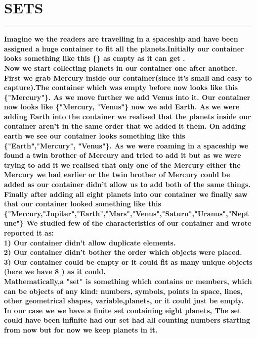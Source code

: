 \documentclass{article}
\begin{document}
\pagebreak

\section*{SETS}
\hrule 
\bigskip
\textbf{Imagine we the readers are travelling in a spaceship and  have been assigned a huge container  to fit all the planets.Initially our container looks something like this \{\} as empty as it can get . 
\\
Now we start collecting planets in our container one after another. First we grab Mercury inside our container(since it's small and easy to capture).The container which was empty before now looks like this \{"Mercury"\}. As we move further we add Venus into it. Our container now looks like \{"Mercury, "Venus"\} now we add Earth. 
As we were adding Earth into the container we realised that the planets inside our container aren't in the same order that we added it them. On adding earth we see our container looks something like this \{"Earth","Mercury", "Venus"\}. As we were roaming in a spaceship we found a twin brother of Mercury and tried to add it but as we were trying to add it we realised that only one of the Mercury either the Mercury we had earlier or the twin brother of Mercury could be added as our container didn't allow us to add both of the same things.  Finally after  adding all eight planets into our container we finally saw that our container looked something like this 
\{"Mercury,"Jupiter","Earth","Mars","Venus","Saturn","Uranus","Neptune"\}
We studied few of the characteristics of our container and wrote reported it as:
\\ 1) Our container didn't allow duplicate elements.
\\ 2) Our container didn't bother the order which objects were placed.
\\ 3) Our container could be empty or it could fit as many unique objects (here we have 8 ) as it could.\\Mathematically,a "set" is something which contains or members, which can be  objects of any kind: numbers, symbols, points in space, lines, other geometrical shapes, variable,planets, or it could just be empty. In our case we we have a finite set containing eight planets, The set could have been infinite had our set had all counting numbers starting from now but for now we keep planets in it.}

\pagebreak 
\end{document}
